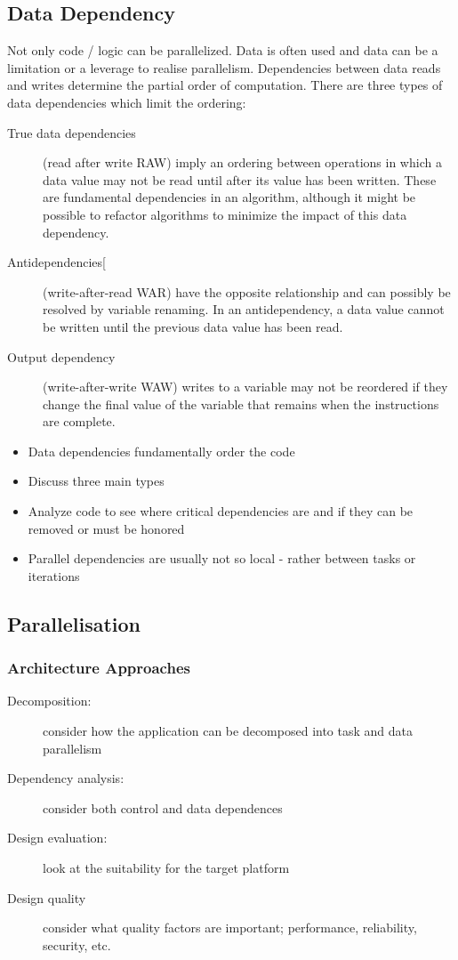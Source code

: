 \subsection{Data Dependency}
Not only code / logic can be parallelized.
Data is often used and data can be a limitation or a leverage to realise parallelism.
Dependencies between data reads and writes determine the partial order of computation.
There are three types of data dependencies which limit the ordering:
\begin{description}
    \item[True data dependencies] (read after write RAW) imply an ordering between operations in which a data value may not be read until after its value has been written.
          These are fundamental dependencies in an algorithm, although it might be possible to refactor algorithms to minimize the impact of this data dependency.
    \item[Antidependencies[] (write-after-read WAR) have the opposite relationship and can possibly be resolved by variable renaming.
          In an antidependency, a data value cannot be written until the previous data value has been read.
    \item[Output dependency] (write-after-write WAW) writes to a variable may not be reordered if they change the final value of the variable that remains when the instructions are complete.
\end{description}
\begin{itemize}
    \item Data dependencies fundamentally order the code
    \item Discuss three main types
    \item Analyze code to see where critical dependencies are and if they can be removed or must be honored
    \item Parallel dependencies are usually not so local - rather between tasks or iterations
\end{itemize}

\subsection{Parallelisation}
\subsubsection{Architecture Approaches}
\begin{description}
    \item[Decomposition:] consider how the application can be decomposed into task and data parallelism
    \item[Dependency analysis:] consider both control and data dependences
    \item[Design evaluation:] look at the suitability for the target platform
    \item[Design quality] consider what quality factors are important; performance, reliability, security, etc.
\end{description}

